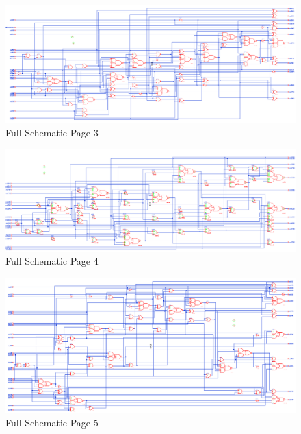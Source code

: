 \documentclass[11pt]{article}
\begin{document}
		\begin{figure}[H] 
			\centering 
			\includegraphics[width=\textwidth,height=\dimexpr\textheight-4\baselineskip-\abovecaptionskip-\belowcaptionskip\relax,keepaspectratio]{"Pictures/Full Schematic Page 3"}
			\caption{Full Schematic Page 3} 
			\label{fig:Full-Schematic-Page-3} 
		\end{figure}
		
		
		\begin{figure}[H] 
			\centering 
			\includegraphics[width=\textwidth,height=\dimexpr\textheight-4\baselineskip-\abovecaptionskip-\belowcaptionskip\relax,keepaspectratio]{"Pictures/Full Schematic Page 4"}
			\caption{Full Schematic Page 4} 
			\label{fig:Full-Schematic-Page-4} 
		\end{figure}
		
		
		\begin{figure}[H] 
			\centering 
			\includegraphics[width=\textwidth,height=\dimexpr\textheight-4\baselineskip-\abovecaptionskip-\belowcaptionskip\relax,keepaspectratio]{"Pictures/Full Schematic Page 5"}
			\caption{Full Schematic Page 5} 
			\label{fig:Full-Schematic-Page-5} 
		\end{figure}
		
\end{document}
